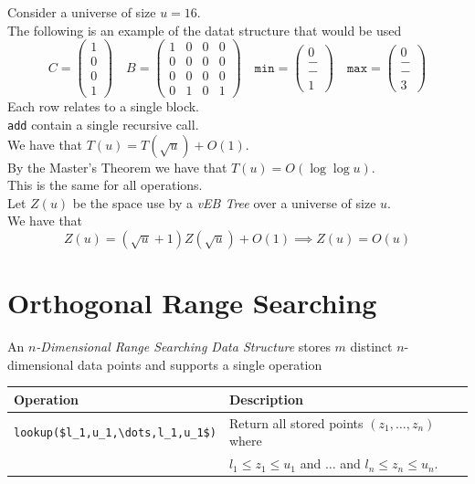 \documentclass[11pt,a4paper]{article}
\begin{document}
Consider a universe of size $u=16$.\\
The following is an example of the datat structure that would be used
$$C=\begin{pmatrix}1\\0\\0\\1\end{pmatrix}\quad B=\begin{pmatrix}1&0&0&0\\0&0&0&0\\0&0&0&0\\0&1&0&1\end{pmatrix}\quad\mathtt{min}=\begin{pmatrix}0\\-\\-\\1\end{pmatrix}\quad\mathtt{max}=\begin{pmatrix}0\\-\\-\\3\end{pmatrix}$$
\nb Each row relates to a single block.\\

\lstinline!add! contain a single recursive call.\\
We have that $T(u)=T(\sqrt{u})+O(1)$.\\
By the Master's Theorem we have that $T(u)=O(\log\log u)$.\\
\nb This is the same for all operations.\\


Let $Z(u)$ be the space use by a \textit{vEB Tree} over a universe of size $u$.\\
We have that
$$Z(u)=(\sqrt{u}+1)Z(\sqrt{u})+O(1)\implies Z(u)=O(u)$$

\section{Orthogonal Range Searching}

An \textit{$n$-Dimensional Range Searching Data Structure} stores $m$ distinct $n$-dimensional data points and supports a single operation
\begin{center}
\begin{tabular}{l|l}
\textbf{Operation}&\textbf{Description}\\\hline
\lstinline!lookup($l_1,u_1,\dots,l_1,u_1$)!&Return all stored points $(z_1,\dots,z_n)$ where\\
&$l_1\leq z_1\leq u_1$ and $\dots$ and $l_n\leq z_n\leq u_n$.
\end{tabular}
\end{center}
\end{document}
